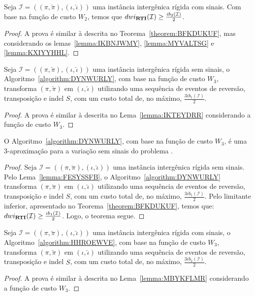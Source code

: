 \begin{theorem}\label{theorem:ACJPZCWD}
Seja $\mathcal{I} = ((\pi,\breve\pi),(\iota,\breve\iota))$ uma instância intergênica rígida com sinais. Com base na função de custo $W_2$, temos que $dwi_{\textbf{RTI}}(\mathcal{I}) \ge \frac{ib_2(\mathcal{I})}{2}$.
\begin{proof}
A prova é similar à descrita no Teorema~\ref{theorem:BFKDUKUF}, mas considerando os lemas~\ref{lemma:IKBNJWMY}, \ref{lemma:MYVALTSG} e \ref{lemma:KXIYYHHL}.
\end{proof}
\end{theorem}

\begin{lemma}\label{lemma:FESYSSFB}
Seja $\mathcal{I} = ((\pi,\breve\pi),(\iota,\breve\iota))$ uma instância intergênica rígida sem sinais, o Algoritmo~\ref{algorithm:DYNWURLY}, com base na função de custo $W_3$, transforma $(\pi,\breve\pi)$ em $(\iota,\breve\iota)$ utilizando uma sequência de eventos de reversão, transposição e indel $S$, com um custo total de, no máximo, $\frac{3ib_1(\mathcal{I})}{2}$.
\end{lemma}
\begin{proof}
  A prova é similar à descrita no Lema~\ref{lemma:IKTEYDRR} considerando a função de custo $W_3$.
\end{proof}

\begin{theorem}\label{theorem:YFYDIUAB}
O Algoritmo~\ref{algorithm:DYNWURLY}, com base na função de custo $W_3$, é uma $3$-aproximação para a variação sem sinais do problema \SbWIRTI{}.
\end{theorem}
\begin{proof}
Seja $\mathcal{I} = ((\pi,\breve\pi),(\iota,\breve\iota))$ uma instância intergênica rígida sem sinais. Pelo Lema~\ref{lemma:FESYSSFB}, o Algoritmo~\ref{algorithm:DYNWURLY} transforma $(\pi,\breve\pi)$ em $(\iota,\breve\iota)$ utilizando uma sequência de eventos de reversão, transposição e indel $S$, com um custo total de, no máximo, $\frac{3ib_1(\mathcal{I})}{2}$. Pelo limitante inferior, apresentado no Teorema~\ref{theorem:BFKDUKUF}, temos que: $dwi_{\textbf{RTI}}(\mathcal{I}) \ge \frac{ib_1(\mathcal{I})}{2}$. Logo, o teorema segue.
\end{proof}

\begin{lemma}\label{lemma:HRFGEWNU}
Seja $\mathcal{I} = ((\pi,\breve\pi),(\iota,\breve\iota))$ uma instância intergênica rígida com sinais, o Algoritmo~\ref{algorithm:HHROEWVE}, com base na função de custo $W_3$, transforma $(\pi,\breve\pi)$ em $(\iota,\breve\iota)$ utilizando uma sequência de eventos de reversão, transposição e indel $S$, com um custo total de, no máximo, $\frac{3ib_2(\mathcal{I})}{2}$.
\end{lemma}
\begin{proof}
  A prova é similar à descrita no Lema~\ref{lemma:MBYKFLMR} considerando a função de custo $W_3$.
\end{proof}

